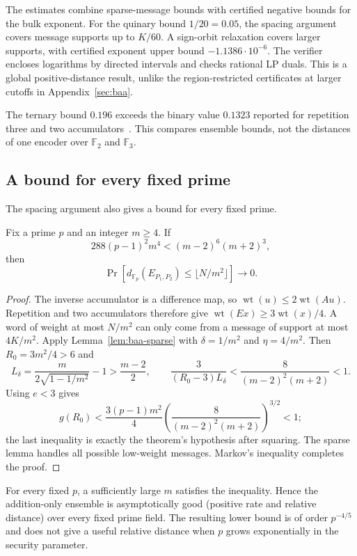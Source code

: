 \documentclass[runningheads,envcountsame,envcountsect]{llncs}
\newcommand{\F}{\mathbb F}
\newcommand{\wt}{\operatorname{wt}}
\begin{document}
The estimates combine sparse-message bounds with certified negative bounds
for the bulk exponent.  For the quinary bound $1/20=0.05$, the spacing
argument covers message supports up to $K/60$.  A sign-orbit relaxation
covers larger supports, with certified exponent upper bound
$-1.1386\cdot10^{-6}$.  The verifier encloses logarithms by directed intervals
and checks rational LP duals.  This is a global positive-distance result,
unlike the region-restricted certificates at larger cutoffs in
Appendix~\ref{sec:baa}.

The ternary bound $0.196$ exceeds the binary value $0.1323$ reported for
repetition three and two accumulators~\cite{kliewer08}.  This compares
ensemble bounds, not the distances of one encoder over $\F_2$ and $\F_3$.



\subsection{A bound for every fixed prime}

The spacing argument also gives a bound for every fixed prime.

\begin{theorem}\label{thm:prime-ladder}
Fix a prime $p$ and an integer $m\ge4$.  If
\[
  288(p-1)^2m^4<(m-2)^6(m+2)^3,
\]
then
\[
  \Pr[d_{\F_p}(E_{P_1,P_2})\le\lfloor N/m^2\rfloor]
  \longrightarrow0.
\]
\end{theorem}

\begin{proof}
The inverse accumulator is a difference map, so
$\wt(u)\le2\wt(Au)$. Repetition and two accumulators therefore give
$\wt(Ex)\ge3\wt(x)/4$. A word of weight at most $N/m^2$
can only come from a message of support at most $4K/m^2$.
Apply Lemma~\ref{lem:baa-sparse} with $\delta=1/m^2$ and
$\eta=4/m^2$. Then $R_0=3m^2/4>6$ and
\[
 L_\delta=\frac{m}{2\sqrt{1-1/m^2}}-1>\frac{m-2}{2},
 \qquad
 \frac{3}{(R_0-3)L_\delta}
 <\frac{8}{(m-2)^2(m+2)}<1.
\]
Using $e<3$ gives
\[
 g(R_0)<\frac{3(p-1)m^2}{4}
       \left(\frac{8}{(m-2)^2(m+2)}\right)^{3/2}<1;
\]
the last inequality is exactly the theorem's hypothesis after squaring.
The sparse lemma handles all possible low-weight messages. Markov's
inequality completes the proof.
\end{proof}

For every fixed $p$, a sufficiently large $m$ satisfies the inequality.
Hence the addition-only ensemble is asymptotically good (positive rate
and relative distance) over every fixed prime field.  The resulting lower bound is of order $p^{-4/5}$ and does not
give a useful relative distance when $p$ grows exponentially in the security
parameter.










\end{document}
